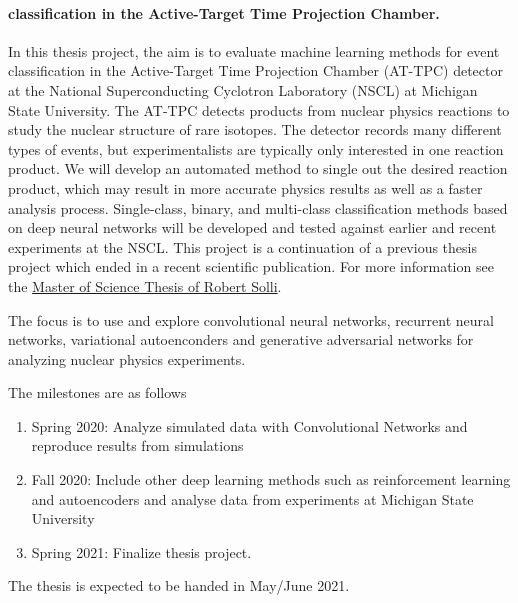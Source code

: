 \documentclass[%
oneside,                 %
final,                   %
10pt]{article}
\begin{document}
\paragraph{classification in the Active-Target Time Projection Chamber.}
In this thesis project, the aim is to evaluate machine learning methods for
event classification in the Active-Target Time Projection Chamber
(AT-TPC) detector at the National Superconducting Cyclotron Laboratory
(NSCL) at Michigan State University. The AT-TPC detects products from
nuclear physics reactions to study the nuclear structure of rare
isotopes. The detector records many different types of events, but
experimentalists are typically only interested in one reaction
product. We will develop an automated method to single out the desired
reaction product, which may result in more accurate physics results as
well as a faster analysis process. Single-class, binary, and
multi-class classification methods based on deep neural networks will
be developed and tested against earlier and recent experiments at the
NSCL.  This project is a continuation of a previous thesis project which ended in a recent scientific publication.
For more information see the \href{{https://github.com/copperwire/thesis/blob/master/main.pdf}}{Master of Science Thesis of Robert Solli}.


The focus is to  use and explore convolutional neural networks, recurrent neural networks, variational
autoenconders and generative adversarial networks for analyzing nuclear physics experiments.



The milestones are as follows

\begin{enumerate}
\item Spring 2020: Analyze simulated data with Convolutional Networks and reproduce results from simulations

\item Fall 2020: Include other deep learning methods such as reinforcement learning and autoencoders and analyse data from experiments at Michigan State University

\item Spring 2021: Finalize thesis project.
\end{enumerate}

\noindent
The thesis is expected to be handed in May/June  2021.




































\end{document}
